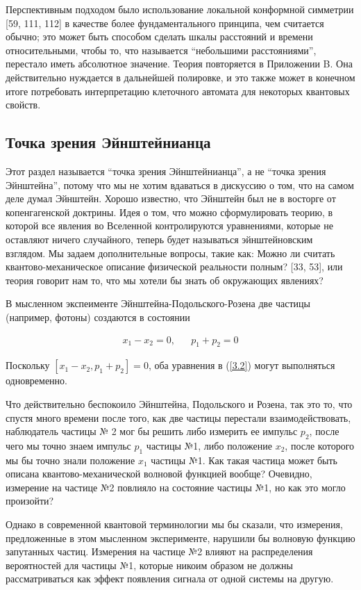 \documentclass[main.tex]{subfiles}
\begin{document}
Перспективным подходом было использование локальной конформной симметрии [59, 111, 112] в качестве более фундаментального принципа, чем считается обычно; это может быть способом сделать шкалы расстояний и времени относительными, чтобы то, что называется ``небольшими расстояниями'', перестало иметь абсолютное значение. Теория повторяется в Приложении B. Она действительно нуждается в дальнейшей полировке, и это также может в конечном итоге потребовать интерпретацию клеточного автомата для некоторых квантовых свойств.

\subsection{Точка зрения Эйнштейнианца}\label{ch3.2}

    
Этот раздел называется ``точка зрения Эйнштейнианца'', а не ``точка зрения Эйнштейна'', потому что мы не хотим вдаваться в дискуссию о том, что на самом деле думал Эйнштейн. Хорошо известно, что Эйнштейн был не в восторге от копенгагенской доктрины. Идея о том, что можно сформулировать теорию, в которой все явления во Вселенной контролируются уравнениями, которые не оставляют ничего случайного, теперь будет называться эйнштейновским взглядом. Мы задаем дополнительные вопросы, такие как: Можно ли считать квантово-механическое описание физической реальности полным? [33, 53], или теория говорит нам то, что мы хотели бы знать об окружающих явлениях?

В мысленном экспеименте Эйнштейна-Подольского-Розена две частицы (например, фотоны) создаются в состоянии

\begin{align}\label{3.2}
	x_1 - x_2 = 0, &&
	p_1 + p_2 = 0
\end{align}

Поскольку $[x_1 - x_2, p_1 + p_2] = 0$, оба уравнения в (\ref{3.2}) могут выполняться одновременно.

Что действительно беспокоило Эйнштейна, Подольского и Розена, так это то, что спустя много времени после того, как две частицы перестали взаимодействовать, наблюдатель частицы № 2 мог бы решить либо измерить ее импульс $p_2$, после чего мы точно знаем импульс $p_1$ частицы №1, либо положение $x_2$, после которого мы бы точно знали положение $x_1$ частицы №1. Как такая частица может быть описана квантово-механической волновой функцией вообще? Очевидно, измерение на частице №2 повлияло на состояние частицы №1, но как это могло произойти?

Однако в современной квантовой терминологии мы бы сказали, что измерения, предложенные в этом мысленном эксперименте, нарушили бы волновую функцию запутанных частиц. Измерения на частице №2 влияют на распределения вероятностей для частицы №1, которые никоим образом не должны рассматриваться как эффект появления сигнала от одной системы на другую.
\end{document}
